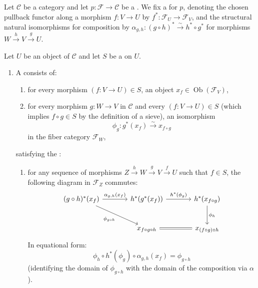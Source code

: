 \begin{definition}
\label{definition:descent_datum_for_a_category_fibered_in_groupoids_over_a_category_relative_to_a_sieve_on_an_object_of_the_base_category}
Let $\mathcal{C}$ be a category and let $p: \mathcal{F} \to \mathcal{C}$ be a . We fix a  for $p$, denoting the chosen pullback functor along a morphism $f: V \to U$ by $f^*: \mathcal{F}_U \to \mathcal{F}_V$, and the structural natural isomorphisms for composition by $\alpha_{g,h}: (g \circ h)^* \xrightarrow{\sim} h^* \circ g^*$ for morphisms $W \xrightarrow{h} V \xrightarrow{g} U$.

Let $U$ be an object of $\mathcal{C}$ and let $S$ be a  on $U$. 

\begin{enumerate}
    \item 
    A  consists of:
    \begin{enumerate}
        \item for every morphism $(f: V \to U) \in S$, an object $x_f \in \operatorname{Ob}(\mathcal{F}_V)$,
        \item for every morphism $g: W \to V$ in $\mathcal{C}$ and every $(f: V \to U) \in S$ (which implies $f \circ g \in S$ by the definition of a sieve), an isomorphism
        $$
        \phi_g: g^*(x_f) \xrightarrow{\sim} x_{f \circ g}
        $$
        in the fiber category $\mathcal{F}_W$,
    \end{enumerate}
    satisfying the : 
    \begin{enumerate}
        \item 
        for any sequence of morphisms $Z \xrightarrow{h} W \xrightarrow{g} V \xrightarrow{f} U$ such that $f \in S$, the following diagram in $\mathcal{F}_Z$ commutes:
        $$
        \begin{tikzcd}[row sep=large, column sep=large]
        (g \circ h)^*(x_f) \arrow[r, "\alpha_{g,h}(x_f)"] \arrow[dr, "\phi_{g \circ h}"'] 
        & h^*(g^*(x_f)) \arrow[r, "h^*(\phi_g)"] 
        & h^*(x_{f \circ g}) \arrow[d, "\phi_h"] \\
        & x_{f \circ g \circ h} 
        & x_{(f \circ g) \circ h} \arrow[l, equal]
        \end{tikzcd}
        $$
        In equational form:
        $$
        \phi_h \circ h^*(\phi_g) \circ \alpha_{g,h}(x_f) = \phi_{g \circ h}
        $$
        (identifying the domain of $\phi_{g \circ h}$ with the domain of the composition via $\alpha$).
    \end{enumerate}


\end{enumerate}
\end{definition}

